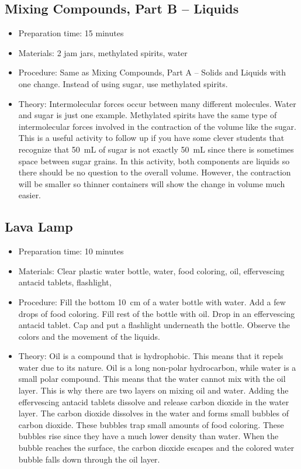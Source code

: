 \subsection{Mixing Compounds, Part B -- Liquids}
\begin{itemize}
\item{Preparation time: 15 minutes}
\item{Materials: 2 jam jars, methylated spirits, water}
\item{Procedure: Same as Mixing Compounds, Part A -- Solids and Liquids  with one change. Instead of using sugar, use methylated spirits. }
\item{Theory: Intermolecular forces occur between many different molecules. Water and sugar is just one example. Methylated spirits have the same type of intermolecular forces involved in the contraction of the volume like the sugar. This is a useful activity to follow up if you have some clever students that recognize that 50~mL of sugar is not exactly 50~mL since there is sometimes space between sugar grains. In this activity, both components are liquids so there should be no question to the overall volume. However, the contraction will be smaller so thinner containers will show the change in volume much easier.}
\end{itemize}

\subsection{Lava Lamp}
\begin{itemize}
\item{Preparation time: 10 minutes}
\item{Materials: Clear plastic water bottle, water, food coloring, oil, effervescing antacid tablets, flashlight,}
\item{Procedure: Fill the bottom 10~cm of a water bottle with water. Add a few drops of food coloring. Fill rest of the bottle with oil. Drop in an effervescing antacid tablet. Cap and put a flashlight underneath the bottle. Observe the colors and the movement of the liquids.}
\item{Theory: Oil is a compound that is hydrophobic. This means that it repels water due to its nature. Oil is a long non-polar hydrocarbon, while water is a small polar compound. This means that the water cannot mix with the oil layer. This is why there are two layers on mixing oil and water. Adding the effervescing antacid tablets dissolve and release carbon dioxide in the water layer. The carbon dioxide dissolves in the water and forms small bubbles of carbon dioxide. These bubbles trap small amounts of food coloring. These bubbles rise since they have a much lower density than water. When the bubble reaches the surface, the carbon dioxide escapes and the colored water bubble falls down through the oil layer.}
\end{itemize}

